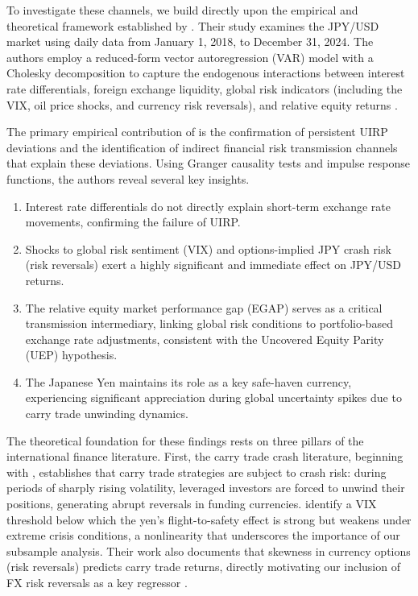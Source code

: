 \documentclass[12pt]{article}
\begin{document}
{} To investigate these channels, we build directly upon the empirical and theoretical framework established by \textcite{guyot2026risk}. Their study examines the JPY/USD market using daily data from January 1, 2018, to December 31, 2024. The authors employ a reduced-form vector autoregression (VAR) model with a Cholesky decomposition to capture the endogenous interactions between interest rate differentials, foreign exchange liquidity, global risk indicators (including the VIX, oil price shocks, and currency risk reversals), and relative equity returns \parencite{guyot2026risk}.

{} The primary empirical contribution of \textcite{guyot2026risk} is the confirmation of persistent UIRP deviations and the identification of indirect financial risk transmission channels that explain these deviations. Using Granger causality tests and impulse response functions, the authors reveal several key insights.
\begin{enumerate}
    \item Interest rate differentials do not directly explain short-term exchange rate movements, confirming the failure of UIRP.
    \item Shocks to global risk sentiment (VIX) and options-implied JPY crash risk (risk reversals) exert a highly significant and immediate effect on JPY/USD returns.
    \item The relative equity market performance gap (EGAP) serves as a critical transmission intermediary, linking global risk conditions to portfolio-based exchange rate adjustments, consistent with the Uncovered Equity Parity (UEP) hypothesis.
    \item The Japanese Yen maintains its role as a key safe-haven currency, experiencing significant appreciation during global uncertainty spikes due to carry trade unwinding dynamics.
\end{enumerate}

{} The theoretical foundation for these findings rests on three pillars of the international finance literature. First, the carry trade crash literature, beginning with \textcite{brunnermeier2009carry}, establishes that carry trade strategies are subject to crash risk: during periods of sharply rising volatility, leveraged investors are forced to unwind their positions, generating abrupt reversals in funding currencies. \textcite{brunnermeier2009carry} identify a VIX threshold below which the yen's flight-to-safety effect is strong but weakens under extreme crisis conditions, a nonlinearity that underscores the importance of our subsample analysis. Their work also documents that skewness in currency options (risk reversals) predicts carry trade returns, directly motivating our inclusion of FX risk reversals as a key regressor \parencite{brunnermeier2009carry}.
\end{document}

